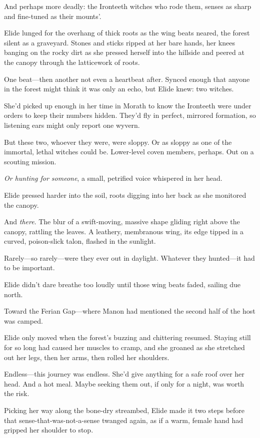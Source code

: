 And perhaps more deadly: the Ironteeth witches who rode them, senses as sharp and fine-tuned as their mounts'.

Elide lunged for the overhang of thick roots as the wing beats neared, the forest silent as a graveyard. Stones and sticks ripped at her bare hands, her knees banging on the rocky dirt as she pressed herself into the hillside and peered at the canopy through the latticework of roots.

One beat---then another not even a heartbeat after. Synced enough that anyone in the forest might think it was only an echo, but Elide knew:
two witches.

She'd picked up enough in her time in Morath to know the Ironteeth were under orders to keep their numbers hidden. They'd fly in perfect, mirrored formation, so listening ears might only report one wyvern.

But these two, whoever they were, were sloppy. Or as sloppy as one of the immortal, lethal witches could be. Lower-level coven members, perhaps. Out on a scouting mission.

\emph{Or hunting for someone}, a small, petrified voice whispered in her head.

Elide pressed harder into the soil, roots digging into her back as she monitored the canopy.

And \emph{there}. The blur of a swift-moving, massive shape gliding right above the canopy, rattling the leaves. A leathery, membranous wing, its edge tipped in a curved, poison-slick talon, flashed in the sunlight.

Rarely---so rarely---were they ever out in daylight. Whatever they hunted---it had to be important.

Elide didn't dare breathe too loudly until those wing beats faded, sailing due north.

Toward the Ferian Gap---where Manon had mentioned the second half of the host was camped.

Elide only moved when the forest's buzzing and chittering resumed. Staying still for so long had caused her muscles to cramp, and she groaned as she stretched out her legs, then her arms, then rolled her shoulders.

Endless---this journey was endless. She'd give anything for a safe roof over her head. And a hot meal. Maybe seeking them out, if only for a night, was worth the risk.

Picking her way along the bone-dry streambed, Elide made it two steps before that sense-that-was-not-a-sense twanged again, as if a warm, female hand had gripped her shoulder to stop.

